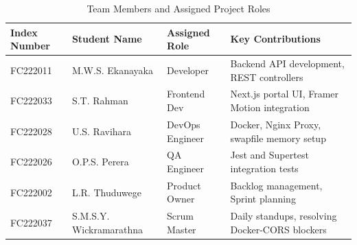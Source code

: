 \documentclass[12pt,a4paper]{article}
\begin{document}
\begin{table}[H]
    \centering
    \caption{Team Members and Assigned Project Roles}
    \vspace{0.3cm}
    \begin{tabularx}{\textwidth}{|l|l|l|X|}
        \hline
        \textbf{Index Number} & \textbf{Student Name} & \textbf{Assigned Role} & \textbf{Key Contributions} \\
        \hline
        FC222011 & M.W.S. Ekanayaka & Developer & Backend API development, REST controllers \\
        \hline
        FC222033 & S.T. Rahman & Frontend Dev & Next.js portal UI, Framer Motion integration \\
        \hline
        FC222028 & U.S. Ravihara & DevOps Engineer & Docker, Nginx Proxy, swapfile memory setup \\
        \hline
        FC222026 & O.P.S. Perera & QA Engineer & Jest and Supertest integration tests \\
        \hline
        FC222002 & L.R. Thuduwege & Product Owner & Backlog management, Sprint planning \\
        \hline
        FC222037 & S.M.S.Y. Wickramarathna & Scrum Master & Daily standups, resolving Docker-CORS blockers \\
        \hline
    \end{tabularx}
\end{table}
\end{document}
